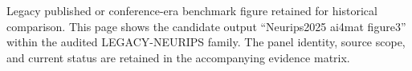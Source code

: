 Legacy published or conference-era benchmark figure retained for historical comparison. This page shows the candidate output ``Neurips2025 ai4mat figure3'' within the audited LEGACY-NEURIPS family. The panel identity, source scope, and current status are retained in the accompanying evidence matrix.
